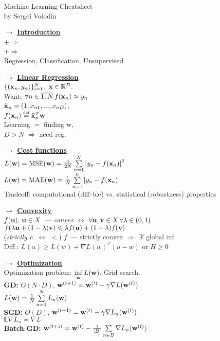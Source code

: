 \documentclass[11pt]{article}
\newcommand{\myvector}[1]{{\bf{#1}}}
\newcommand{\x}{\myvector{x}}
\newcommand{\w}{\myvector{w}}
\newcommand{\uu}{\myvector{u}}
\newcommand{\vv}{\myvector{v}}
\newcommand{\eqdef}{\overset{\mbox{\tiny{def}}}{=}}
\newcommand{\mytitle}[1]{ {\bf $\rightarrow$ \underline{#1}}\\}
\begin{document}
\begin{center}
	{\large Machine Learning Cheatsheet}\\
	by Sergei Volodin
\end{center}
\begin{multicols*}{2}
\mytitle{Introduction}
+$\Rightarrow$\\
+$\Rightarrow$\\
Regression, Classification, Unsupervised

\mytitle{Linear Regression}
$\{(\x_n, y_n)\}_{i=1}^N$, $\x\in \mathbb{R}^D$.\\
Want: $\forall n\in\overline{1, N}\,f(\x_n)\approx y_n$\\
$\tilde{\x}_n=(1,x_{n1},...,x_{nD})$,\\
$f(\x_n)\eqdef \tilde{\x}_n^T\w$\\
Learning $=$ finding w,\\
$D>N$ $\Rightarrow$ need reg.

\mytitle{Cost functions}
$L(\w)=\mbox{MSE}(\w)=\frac{1}{2N}\sum\limits_{n=1}^N\left[y_n-f(\x_n)\right]^2$\\
$L(\w)=\mbox{MAE}(\w)=\frac{1}{N}\sum\limits_{n=1}^n\left|y_n-f(\x_n)\right|$\\

Tradeoff: computational (diff-ble) vs. statistical (robustness) properties

\mytitle{Convexity}
$f(\uu),\,\uu\in X$~--- {\em convex} $\Leftrightarrow$
$\forall \uu, \vv\in X\,\forall \lambda\in \left(0,1\right)$\\
$f(\lambda \uu + (1-\lambda) \vv)\leqslant \lambda f(\uu)+(1-\lambda)f(\vv)$\\
({\em strictly c.} $\Leftrightarrow$ $<$)
$f$~--- strictly convex $\Rightarrow$ $\exists !$ global inf.\\
Diff.: $L(u)\geqslant L(w)+\nabla L(w)^T(u-w)$ or $H\geqslant 0$

\mytitle{Optimization}
Optimization problem:
$\inf\limits_{\w}L(\w)$. Grid search.\\
{\bf GD:} $O(N\cdot D)$, $\w^{(t+1)}=\w^{(t)}-\gamma\nabla L(\w^{(t)})$\\
$L(\w)=\frac{1}{N}\sum\limits_{n=1}^N L_n(\w)$\\
{\bf SGD:} $O(D)$, $\w^{(t+1)}=\w^{(t)}-\gamma\nabla L_n(\w^{(t)})$\\
$\mathbb{E}\nabla L_n=\nabla L$\\
{\bf Batch GD:}  $\w^{(t+1)}=\w^{(t)}-\frac{\gamma}{|B|} \sum\limits_{n\in B}\nabla L_n(\w^{(t)})$


\end{multicols*}
\end{document}
